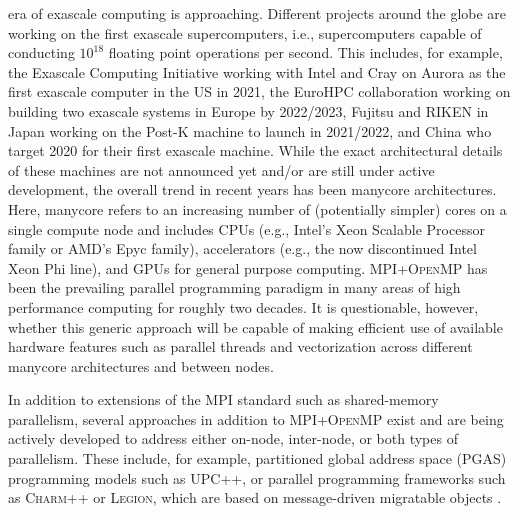 \documentclass[10pt,journal,compsoc]{IEEEtran}
\newcommand{\textcode}[1]{\textsc{#1}}
\newcommand{\mpi}{\textcode{MPI}\xspace}
\newcommand{\mpiopenmp}{\textcode{MPI+OpenMP}\xspace}
\newcommand{\upcpp}{\textcode{UPC++}\xspace}
\newcommand{\charmpp}{\textcode{Charm++}\xspace}
\newcommand{\legion}{\textcode{Legion}\xspace}
\begin{document}
% 
% 
% 
% 
 era of exascale computing is approaching.
Different projects around the globe are working on the first exascale
supercomputers, i.e., supercomputers capable of conducting $10^{18}$
 floating point operations per second.
This includes, for example, the Exascale Computing Initiative working
with Intel and Cray on Aurora as the first exascale computer in the US in 2021,
the EuroHPC collaboration working on building two exascale systems in Europe by
2022/2023, Fujitsu and RIKEN in Japan working on the Post-K machine to launch in 
2021/2022, and China who target 2020 for their first exascale machine.
While the exact architectural details of these machines are not announced yet and/or are still
under active development, the overall trend in recent years has been manycore 
architectures.
Here, manycore refers to an increasing number of (potentially simpler) cores on a single
compute node and includes CPUs 
(e.g., Intel's Xeon Scalable Processor family or  AMD's Epyc family),
accelerators (e.g., the now discontinued Intel Xeon Phi line), and GPUs for general
purpose computing.
\mpiopenmp has been the prevailing parallel programming paradigm in many areas 
of high performance computing for roughly two decades.
It is questionable, however, whether this generic approach will be capable
of making efficient use of available hardware features such as parallel threads and
vectorization across different manycore architectures and between nodes.

In addition to extensions of the \mpi standard such as shared-memory parallelism, 
several approaches in addition to \mpiopenmp exist and are being actively developed to address 
either on-node, inter-node, or both types of parallelism.
These include, for example, partitioned global address space (PGAS) programming models
such as \upcpp \cite{upcpp}, or parallel programming frameworks such as
\charmpp or \legion, which are based on  message-driven migratable
objects \cite{charmpp,legion}.
\end{document}
